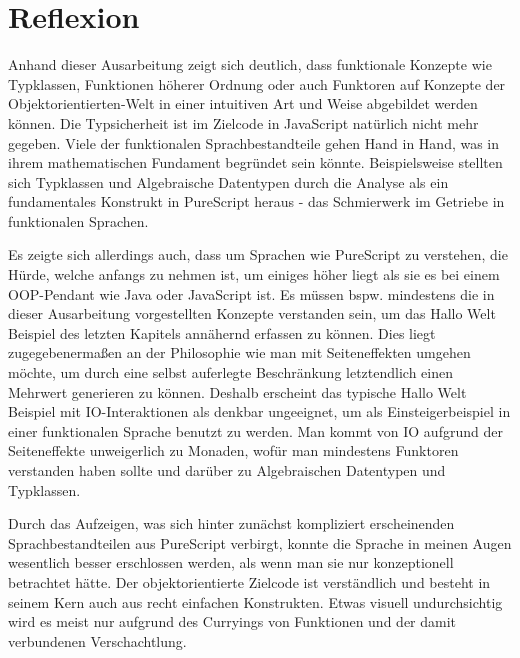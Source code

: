 \documentclass[
12pt,
ngerman,
oneside]
{scrbook} %
\begin{document}
\chapter{Reflexion}
Anhand dieser Ausarbeitung zeigt sich deutlich, dass funktionale Konzepte wie Typklassen, Funktionen höherer Ordnung oder auch Funktoren auf Konzepte der Objektorientierten-Welt in einer intuitiven Art und Weise abgebildet werden können. Die Typsicherheit ist im Zielcode in JavaScript natürlich nicht mehr gegeben. Viele der funktionalen Sprachbestandteile gehen Hand in Hand, was in ihrem mathematischen Fundament begründet sein könnte. Beispielsweise stellten sich Typklassen und Algebraische Datentypen durch die Analyse als ein fundamentales Konstrukt in PureScript heraus - das Schmierwerk im Getriebe in funktionalen Sprachen. 

Es zeigte sich allerdings auch, dass um Sprachen wie PureScript zu verstehen, die Hürde, welche anfangs zu nehmen ist, um einiges höher liegt als sie es bei einem OOP-Pendant wie Java oder JavaScript ist. Es müssen bspw. mindestens die in dieser Ausarbeitung vorgestellten Konzepte verstanden sein, um das Hallo Welt Beispiel des letzten Kapitels annähernd erfassen zu können. Dies liegt zugegebenermaßen an der Philosophie wie man mit Seiteneffekten umgehen möchte, um durch eine selbst auferlegte  Beschränkung letztendlich einen Mehrwert generieren zu können. Deshalb erscheint das typische Hallo Welt Beispiel mit IO-Interaktionen als denkbar ungeeignet, um als Einsteigerbeispiel in einer funktionalen Sprache benutzt zu werden. Man kommt von IO aufgrund der Seiteneffekte unweigerlich zu Monaden, wofür man mindestens Funktoren verstanden haben sollte und darüber zu Algebraischen Datentypen und Typklassen.

Durch das Aufzeigen, was sich hinter zunächst kompliziert erscheinenden Sprachbestandteilen aus PureScript verbirgt, konnte die Sprache in meinen Augen wesentlich besser erschlossen werden, als wenn man sie nur konzeptionell betrachtet hätte. Der objektorientierte Zielcode ist verständlich und besteht in seinem Kern auch aus recht einfachen Konstrukten. Etwas visuell undurchsichtig wird es meist nur aufgrund des Curryings von Funktionen und der damit verbundenen Verschachtlung.



\listoffigures
{}
\lstlistoflistings 

\printbibliography[title=Literaturverzeichnis]
\end{document}
